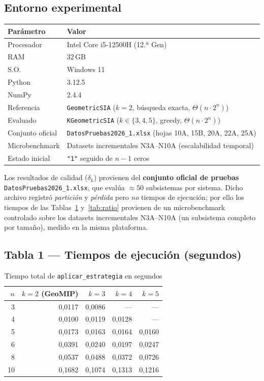 \documentclass[12pt,letterpaper]{article}
\theoremstyle{definition}
\theoremstyle{remark}
\newcommand{\BigTheta}[1]{\Theta(#1)}
\begin{document}
\subsection{Entorno experimental}

\begin{center}
\begin{tabular}{@{}l l@{}}
\toprule
\textbf{Parámetro} & \textbf{Valor} \\
\midrule
Procesador & Intel Core i5-12500H (12.ª Gen) \\
RAM        & 32\,GB \\
S.O.       & Windows 11 \\
Python     & 3.12.5 \\
NumPy      & 2.4.4 \\
Referencia & \texttt{GeometricSIA} ($k=2$, búsqueda exacta, $\BigTheta{n \cdot 2^n}$) \\
Evaluado   & \texttt{KGeometricSIA} ($k \in \{3,4,5\}$, greedy, $\BigTheta{n \cdot 2^n}$) \\
Conjunto oficial & \texttt{DatosPruebas2026\_1.xlsx} (hojas 10A, 15B, 20A, 22A, 25A) \\
Microbenchmark & Datasets incrementales N3A--N10A (escalabilidad temporal) \\
Estado inicial & \texttt{"1"} seguido de $n-1$ ceros \\
\bottomrule
\end{tabular}
\end{center}

Los resultados de calidad ($\delta_k$) provienen del \textbf{conjunto oficial de pruebas}
\texttt{DatosPruebas2026\_1.xlsx}, que evalúa $\approx 50$ subsistemas por sistema. Dicho
archivo registró \emph{partición} y \emph{pérdida} pero \emph{no} tiempos de ejecución;
por ello los tiempos de las Tablas~\ref{tab:tiempos} y~\ref{tab:ratio} provienen de un
microbenchmark controlado sobre los datasets incrementales N3A--N10A (un subsistema completo
por tamaño), medido en la misma plataforma.

\subsection{Tabla 1 --- Tiempos de ejecución (segundos)}

\begin{table}[ht]
\centering
\caption{Tiempo total de \texttt{aplicar\_estrategia} en segundos}
\label{tab:tiempos}
\begin{tabular}{@{}r r r r r@{}}
\toprule
$n$ & $k=2$ (GeoMIP) & $k=3$ & $k=4$ & $k=5$ \\
\midrule
3  & 0{,}0117 & 0{,}0086 & ---    & ---    \\
4  & 0{,}0100 & 0{,}0119 & 0{,}0128 & ---    \\
5  & 0{,}0173 & 0{,}0163 & 0{,}0164 & 0{,}0160 \\
6  & 0{,}0391 & 0{,}0240 & 0{,}0197 & 0{,}0247 \\
8  & 0{,}0537 & 0{,}0488 & 0{,}0372 & 0{,}0726 \\
10 & 0{,}1682 & 0{,}1074 & 0{,}1313 & 0{,}1216 \\
\bottomrule
\end{tabular}
\end{table}
\end{document}
